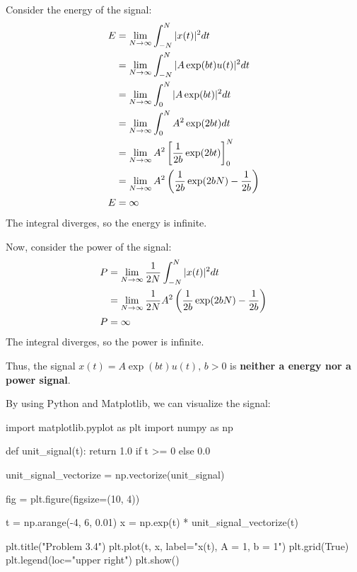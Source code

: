\documentclass[a4paper, 10pt]{article}
\begin{document}
\begin{solution}
Consider the energy of the signal:
\begin{align*}
    E &= \lim_{N \to \infty} \int_{-N}^{N} |x(t)|^2 dt \\
    &= \lim_{N \to \infty} \int_{-N}^{N} |A\exp(bt)u(t)|^2 dt \\
    &= \lim_{N \to \infty} \int_{0}^{N} |A\exp(bt)|^2 dt \\
    &= \lim_{N \to \infty} \int_{0}^{N} A^2\exp(2bt) dt \\
    &= \lim_{N \to \infty} A^2 \left[ \frac{1}{2b} \exp(2bt) \right]_{0}^{N} \\
    &= \lim_{N \to \infty} A^2 \left( \frac{1}{2b} \exp(2bN) - \frac{1}{2b} \right) \\
    E &= \infty
\end{align*}
The integral diverges, so the energy is infinite.

\vspace{5mm}

Now, consider the power of the signal:
\begin{align*}
    P &= \lim_{N \to \infty} \frac{1}{2N} \int_{-N}^{N} |x(t)|^2 dt \\
    &= \lim_{N \to \infty} \frac{1}{2N} A^2 \left( \frac{1}{2b} \exp(2bN) - \frac{1}{2b} \right) \\
    P &= \infty
\end{align*}
The integral diverges, so the power is infinite.

\vspace{2mm}

Thus, the signal \( x(t) = A\exp(bt)u(t), \,  b > 0 \) is \textbf{neither a energy nor a power signal}.

\vspace{2mm}

By using Python and Matplotlib, we can visualize the signal:
\begin{codingbox}
import matplotlib.pyplot as plt
import numpy as np

def unit_signal(t):
    return 1.0 if t >= 0 else 0.0

unit_signal_vectorize = np.vectorize(unit_signal)

fig = plt.figure(figsize=(10, 4))

t = np.arange(-4, 6, 0.01)
x = np.exp(t) * unit_signal_vectorize(t)

plt.title("Problem 3.4")
plt.plot(t, x, label="x(t), A = 1, b = 1")
plt.grid(True)
plt.legend(loc="upper right")
plt.show()
\end{codingbox}


\end{solution}
\end{document}
